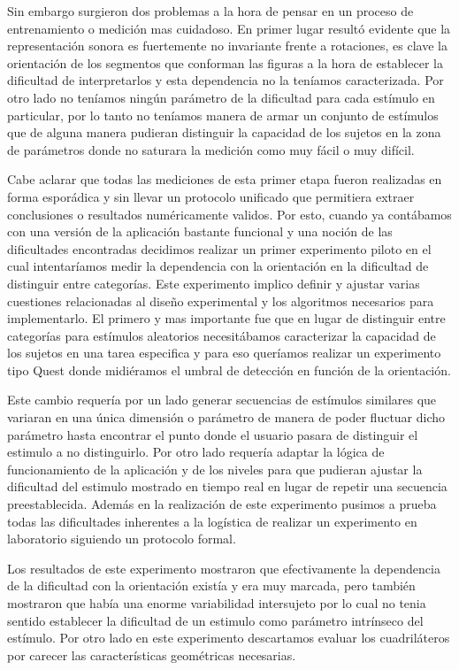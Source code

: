\documentclass{article}
\begin{document}
    Sin embargo surgieron dos problemas a la hora de pensar en un proceso de entrenamiento o medición mas cuidadoso. En primer lugar resultó evidente que la representación sonora es fuertemente no invariante frente a rotaciones, es clave la orientación de los segmentos que conforman las figuras a la hora de establecer la dificultad de interpretarlos y esta dependencia no la teníamos caracterizada. Por otro lado no teníamos ningún parámetro de la dificultad para cada estímulo en particular, por lo tanto no teníamos manera de armar un conjunto de estímulos que de alguna manera pudieran distinguir la capacidad de los sujetos en la zona de parámetros donde no saturara la medición como muy fácil o muy difícil. 
    
    Cabe aclarar que todas las mediciones de esta primer etapa fueron realizadas en forma esporádica y sin llevar un protocolo unificado que permitiera extraer conclusiones o resultados numéricamente validos. Por esto, cuando ya contábamos con una versión de la aplicación bastante funcional y una noción de las dificultades encontradas decidimos realizar un primer experimento piloto en el cual intentaríamos medir la dependencia con la orientación en la dificultad de distinguir entre categorías. Este experimento implico definir y ajustar varias cuestiones relacionadas al diseño experimental y los algoritmos necesarios para implementarlo. El primero y mas importante fue que en lugar de distinguir entre categorías para estímulos aleatorios necesitábamos caracterizar la capacidad de los sujetos en una tarea especifica y para eso queríamos realizar un experimento tipo Quest donde midiéramos el umbral de detección en función de la orientación. 
    
    Este cambio requería por un lado generar secuencias de estímulos similares que variaran en una única dimensión o parámetro de manera de poder fluctuar dicho parámetro hasta encontrar el punto donde el usuario pasara de distinguir el estimulo a no distinguirlo. Por otro lado requería adaptar la lógica de funcionamiento de la aplicación y de los niveles para que pudieran ajustar la dificultad del estimulo mostrado en tiempo real en lugar de repetir una secuencia preestablecida. Además en la realización de este experimento pusimos a prueba todas las dificultades inherentes a la logística de realizar un experimento en laboratorio siguiendo un protocolo formal.
    
    Los resultados de este experimento mostraron que efectivamente la dependencia de la dificultad con la orientación existía y era muy marcada, pero también mostraron que había una enorme variabilidad intersujeto por lo cual no tenia sentido establecer la dificultad de un estimulo como parámetro intrínseco del estímulo. Por otro lado en este experimento descartamos evaluar los cuadriláteros por carecer las características geométricas necesarias. 
    
\end{document}
